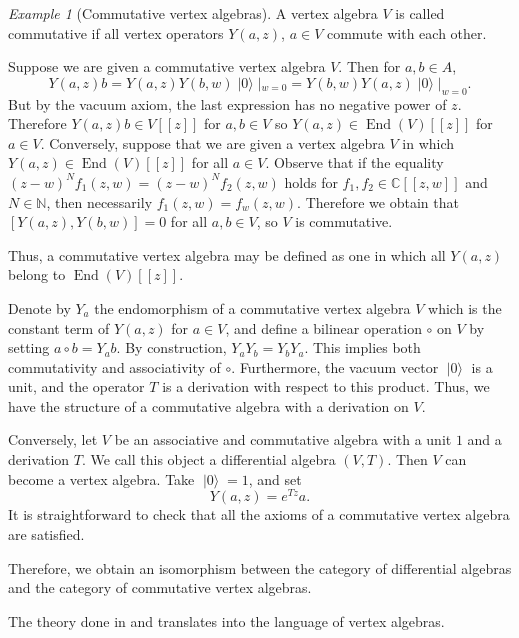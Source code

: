 \documentclass[a4paper, 12pt, reqno]{amsart}
\theoremstyle{remark}
\newtheorem{example}[theorem]{Example}
\numberwithin{equation}{subsection}
\DeclareMathOperator{\End}{End}
\DeclareMathOperator{\vac}{|0\rangle}
\begin{document}
\begin{example}[Commutative vertex algebras]
  \label{exa:4}
  A vertex algebra $V$ is called commutative if all vertex operators $Y(a, z)$, $a \in V$ commute with each other.
  
  Suppose we are given a commutative vertex algebra $V$.
  Then for $a, b \in A$,
  \begin{equation*}
    Y(a, z)b = Y(a, z)Y(b, w)\vac|_{w = 0} = Y(b, w)Y(a, z)\vac|_{w = 0}.
  \end{equation*}
  But by the vacuum axiom, the last expression has no negative power of $z$.
  Therefore $Y(a, z)b \in V[[z]]$ for $a, b \in V$ so $Y(a, z) \in \End(V)[[z]]$ for $a \in V$.
  Conversely, suppose that we are given a vertex algebra $V$ in which $Y(a, z) \in \End(V)[[z]]$ for all $a \in V$.
  Observe that if the equality $(z - w)^Nf_1(z, w) = (z - w)^Nf_2(z, w)$ holds for $f_1, f_2 \in \mathbb{C}[[z, w]]$ and $N \in \mathbb{N}$, then necessarily $f_1(z, w) = f_w(z, w)$.
  Therefore we obtain that $[Y(a, z), Y(b, w)] = 0$ for all $a, b \in V$, so $V$ is commutative.
  
  Thus, a commutative vertex algebra may be defined as one in which all $Y(a, z)$ belong to $\End(V)[[z]]$.

  Denote by $Y_a$ the endomorphism of a commutative vertex algebra $V$ which is the constant term of $Y(a, z)$ for $a \in V$, and define a bilinear operation $\circ$ on $V$ by setting $a\circ b=Y_ab$.
  By construction, $Y_aY_b = Y_bY_a$.
  This implies both commutativity and associativity of $\circ$.
  Furthermore, the vacuum vector $\vac$ is a unit, and the operator $T$ is a derivation with respect to this product.
  Thus, we have the structure of a commutative algebra with a derivation on $V$.

  Conversely, let $V$ be an associative and commutative algebra with a unit $1$ and a derivation $T$.
  We call this object a differential algebra $(V, T)$.
  Then $V$ can become a vertex algebra.
  Take $\vac = 1$, and set
  \begin{equation*}
    Y(a, z) = e^{Tz}a.
  \end{equation*}
  It is straightforward to check that all the axioms of a commutative vertex algebra are satisfied.

  Therefore, we obtain an isomorphism between the category of differential algebras and the category of commutative vertex algebras.
\end{example}

The theory done in  and  translates into the language of vertex algebras.
\end{document}
